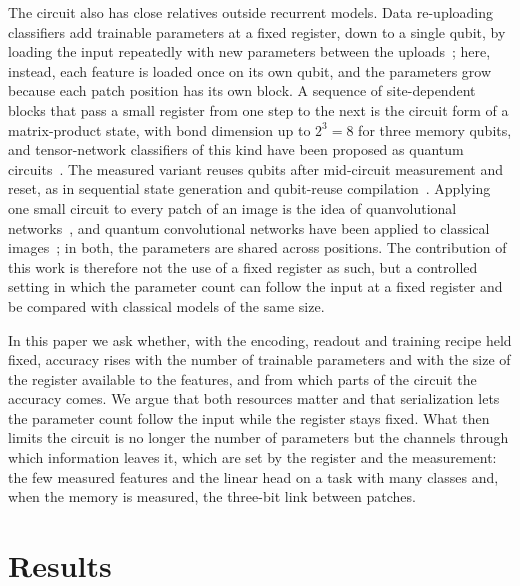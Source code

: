 \documentclass[11pt]{article}
\begin{document}
The circuit also has close relatives outside recurrent models. Data re-uploading classifiers add trainable parameters at a fixed register, down to a single qubit, by loading the input repeatedly with new parameters between the uploads~\cite{perezsalinas2020reuploading,perezsalinas2021onequbit}; here, instead, each feature is loaded once on its own qubit, and the parameters grow because each patch position has its own block. A sequence of site-dependent blocks that pass a small register from one step to the next is the circuit form of a matrix-product state, with bond dimension up to $2^3=8$ for three memory qubits, and tensor-network classifiers of this kind have been proposed as quantum circuits~\cite{huggins2019tensor}. The measured variant reuses qubits after mid-circuit measurement and reset, as in sequential state generation and qubit-reuse compilation~\cite{schon2005sequential,decross2023qubitreuse}. Applying one small circuit to every patch of an image is the idea of quanvolutional networks~\cite{henderson2020quanvolutional}, and quantum convolutional networks have been applied to classical images~\cite{cong2019qcnn,hur2022qcnn}; in both, the parameters are shared across positions. The contribution of this work is therefore not the use of a fixed register as such, but a controlled setting in which the parameter count can follow the input at a fixed register and be compared with classical models of the same size.

In this paper we ask whether, with the encoding, readout and training recipe held fixed, accuracy rises with the number of trainable parameters and with the size of the register available to the features, and from which parts of the circuit the accuracy comes. We argue that both resources matter and that serialization lets the parameter count follow the input while the register stays fixed. What then limits the circuit is no longer the number of parameters but the channels through which information leaves it, which are set by the register and the measurement: the few measured features and the linear head on a task with many classes and, when the memory is measured, the three-bit link between patches.

%
\section{Results}
\label{sec:results}
\end{document}
